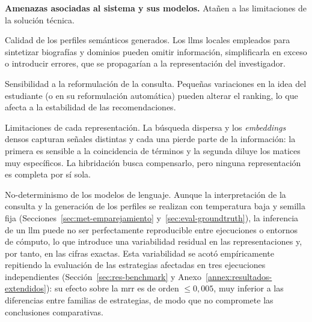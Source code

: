 \textbf{Amenazas asociadas al sistema y sus modelos.} Atañen a las limitaciones de la solución técnica.

\begin{mydescription}
    \item[Calidad de los perfiles semánticos generados.]
    Los \glspl{llm} locales empleados para sintetizar biografías y dominios pueden omitir información, simplificarla en exceso o introducir errores, que se propagarían a la representación del investigador.
    \item[Sensibilidad a la reformulación de la consulta.]
    Pequeñas variaciones en la idea del estudiante (o en su reformulación automática) pueden alterar el ranking, lo que afecta a la estabilidad de las recomendaciones.
    \item[Limitaciones de cada representación.]
    La búsqueda dispersa y los \emph{embeddings} densos capturan señales distintas y cada una pierde parte de la información: la primera es sensible a la coincidencia de términos y la segunda diluye los matices muy específicos.
    La hibridación busca compensarlo, pero ninguna representación es completa por sí sola.
    \item[No-determinismo de los modelos de lenguaje.]
    Aunque la interpretación de la consulta y la generación de los perfiles se realizan con temperatura baja y semilla fija (Secciones~\ref{sec:met-emparejamiento} y~\ref{sec:eval-groundtruth}), la inferencia de un \gls{llm} puede no ser perfectamente reproducible entre ejecuciones o entornos de cómputo, lo que introduce una variabilidad residual en las representaciones y, por tanto, en las cifras exactas.
    Esta variabilidad se acotó empíricamente repitiendo la evaluación de las estrategias afectadas en tres ejecuciones independientes (Sección~\ref{sec:res-benchmark} y Anexo~\ref{annex:resultados-extendidos}): su efecto sobre la \gls{mrr} es de orden $\le 0{,}005$, muy inferior a las diferencias entre familias de estrategias, de modo que no compromete las conclusiones comparativas.
\end{mydescription}
